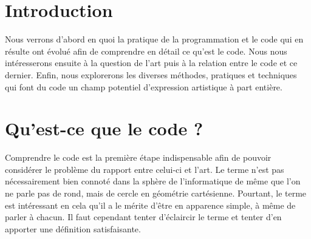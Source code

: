 \documentclass[12pt]{article} %
\begin{document}
\def\lstlistingautorefname{Cd.}
\renewcommand{\lstlistingname}{Code}
\renewcommand{\lstlistlistingname}{Codes et programmes}
\lstlistoflistings

\newpage
{} %

\section{Introduction}
Nous verrons d'abord en quoi la pratique de la programmation et le code qui en résulte ont évolué afin de comprendre en détail ce qu'est le code. Nous nous intéresserons ensuite à la question de l'art puis à la relation entre le code et ce dernier. Enfin, nous explorerons les diverses méthodes, pratiques et techniques qui font du code un champ potentiel d'expression artistique à part entière.

\section{Qu'est-ce que le code ?}
Comprendre le code est la première étape indispensable afin de pouvoir considérer le problème du rapport entre celui-ci et l'art. Le terme n'est pas nécessairement bien connoté dans la sphère de l'informatique de même que l'on ne parle pas de rond, mais de cercle en géométrie cartésienne. Pourtant, le terme est intéressant en cela qu'il a le mérite d'être en apparence simple, à même de parler à chacun. Il faut cependant tenter d'éclaircir le terme et tenter d'en apporter une définition satisfaisante.
\end{document}

